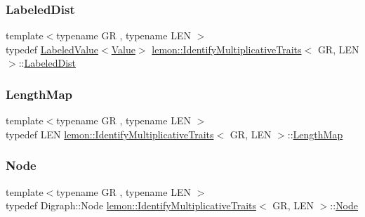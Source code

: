 \subsubsection{\texorpdfstring{Labeled\+Dist}{LabeledDist}}
{\footnotesize\ttfamily template$<$typename GR , typename L\+EN $>$ \\
typedef \hyperlink{classlemon_1_1_labeled_value}{Labeled\+Value}$<$\hyperlink{structlemon_1_1_identify_multiplicative_traits_ae44c59a817f36ac3d7c024fc75d5ae50}{Value}$>$ \hyperlink{structlemon_1_1_identify_multiplicative_traits}{lemon\+::\+Identify\+Multiplicative\+Traits}$<$ GR, L\+EN $>$\+::\hyperlink{structlemon_1_1_identify_multiplicative_traits_a91b3da314fe157ce5c2674e3608d4cde}{Labeled\+Dist}}

\mbox{\label{structlemon_1_1_identify_multiplicative_traits_a134355b88655b1c297264296d2c70d3a}} 
\subsubsection{\texorpdfstring{Length\+Map}{LengthMap}}
{\footnotesize\ttfamily template$<$typename GR , typename L\+EN $>$ \\
typedef L\+EN \hyperlink{structlemon_1_1_identify_multiplicative_traits}{lemon\+::\+Identify\+Multiplicative\+Traits}$<$ GR, L\+EN $>$\+::\hyperlink{structlemon_1_1_identify_multiplicative_traits_a134355b88655b1c297264296d2c70d3a}{Length\+Map}}

\mbox{\label{structlemon_1_1_identify_multiplicative_traits_a391c4d6be09a511224b23628fbc9c223}} 
\subsubsection{\texorpdfstring{Node}{Node}}
{\footnotesize\ttfamily template$<$typename GR , typename L\+EN $>$ \\
typedef Digraph\+::\+Node \hyperlink{structlemon_1_1_identify_multiplicative_traits}{lemon\+::\+Identify\+Multiplicative\+Traits}$<$ GR, L\+EN $>$\+::\hyperlink{structlemon_1_1_identify_multiplicative_traits_a391c4d6be09a511224b23628fbc9c223}{Node}}

